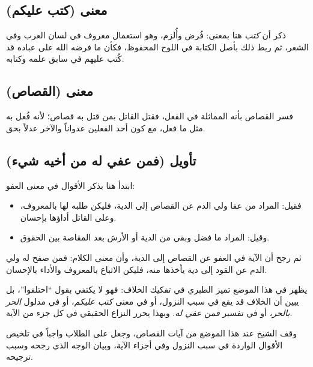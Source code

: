 \subsection{معنى (كتب عليكم)}
ذكر  أن \textit{كتب} هنا بمعنى: فُرض وأُلزم، وهو استعمال معروف في لسان العرب وفي الشعر، ثم ربط ذلك بأصل الكتابة في اللوح المحفوظ، فكأن ما فرضه الله على عباده قد كُتب عليهم في سابق علمه وكتابه.

\subsection{معنى (القصاص)}
فسر  القصاص بأنه المماثلة في الفعل، فقتل القاتل بمن قتل به قصاص؛ لأنه فُعل به مثل ما فعل، مع كون أحد الفعلين عدواناً والآخر عدلاً بحق.

\subsection{تأويل (فمن عفي له من أخيه شيء)}
ابتدأ  هنا بذكر الأقوال في معنى العفو:
\begin{itemize}
    \item فقيل: المراد من عفا ولي الدم عن القصاص إلى الدية، فليكن طلبه لها بالمعروف، وعلى القاتل أداؤها بإحسان.
    \item وقيل: المراد ما فضل وبقي من الدية أو الأرش بعد المقاصة بين الحقوق.
\end{itemize}

ثم رجح أن الآية في العفو عن القصاص إلى الدية، وأن معنى الكلام: فمن صفح له ولي الدم عن القود إلى دية يأخذها منه، فليكن الاتباع بالمعروف والأداء بالإحسان.

\begin{fawaid}
يظهر في هذا الموضع تميز الطبري في تفكيك الخلاف: فهو لا يكتفي بقول ``اختلفوا''، بل يبين أن الخلاف قد يقع في سبب النزول، أو في معنى \textit{كتب عليكم}، أو في مدلول \textit{الحر بالحر}، أو في تفسير \textit{فمن عفي له}. وبهذا يحرر النزاع الحقيقي في كل جزء من الآية.
\end{fawaid}

\separator

وقف الشيخ عند هذا الموضع من آيات القصاص، وجعل على الطلاب واجباً في تلخيص الأقوال الواردة في سبب النزول وفي أجزاء الآية، وبيان الوجه الذي رجحه  وسبب ترجيحه.
